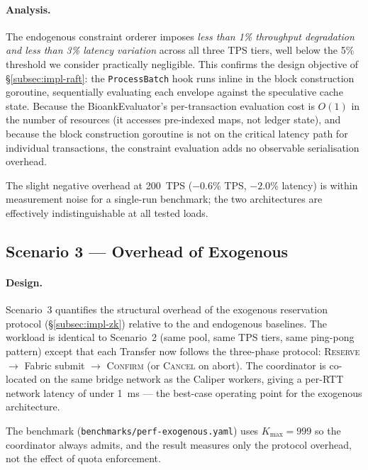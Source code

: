 \paragraph{Analysis.}
The  endogenous constraint orderer imposes \emph{less than 1\%
throughput degradation and less than 3\% latency variation} across all three
TPS tiers, well below the 5\% threshold we consider practically negligible.
This confirms the design objective of \S\ref{subsec:impl-raft}: the
\texttt{ProcessBatch} hook runs inline in the block construction goroutine,
sequentially evaluating each envelope against the speculative cache state.
Because the BioankEvaluator's per-transaction evaluation cost is $O(1)$ in the
number of resources (it accesses pre-indexed maps, not ledger state), and
because the block construction goroutine is not on the critical latency path
for individual transactions, the constraint evaluation adds no observable
serialisation overhead.

The slight negative overhead at 200~TPS ($-0.6$\% TPS, $-2.0$\% latency)
is within measurement noise for a single-run benchmark; the two architectures
are effectively indistinguishable at all tested loads.

\subsection{Scenario 3 — Overhead of \texorpdfstring{}{M\_D} Exogenous}
\label{subsec:eval-sc3}

\paragraph{Design.}
Scenario~3 quantifies the structural overhead of the exogenous reservation
protocol (\S\ref{subsec:impl-zk}) relative to the  and 
endogenous baselines.  The workload is identical to Scenario~2 (same pool,
same TPS tiers, same ping-pong pattern) except that each Transfer now follows
the three-phase protocol: \textsc{Reserve} $\to$ Fabric submit $\to$
\textsc{Confirm} (or \textsc{Cancel} on abort).  The coordinator is co-located
on the same bridge network as the Caliper workers, giving a per-RTT network
latency of under 1~ms — the best-case operating point for the exogenous
architecture.

The benchmark (\texttt{benchmarks/perf-exogenous.yaml}) uses $K_\text{max} = 999$
so the coordinator always admits, and the result measures only the protocol
overhead, not the effect of quota enforcement.

